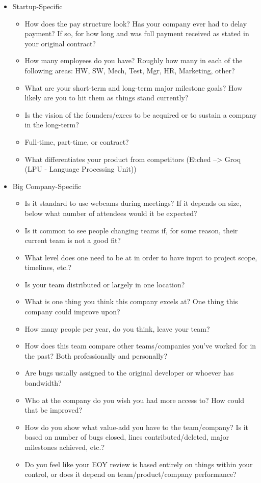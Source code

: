 \documentclass{article}
\begin{document}
\begin{itemize}
\begin{itemize}
    \end{itemize}
  \item Startup-Specific
    \begin{itemize}
      \item How does the pay structure look? Has your company ever had to delay payment? If so, for how long and was full payment received as stated in your original contract?
      \item How many employees do you have? Roughly how many in each of the following areas: HW, SW, Mech, Test, Mgr, HR, Marketing, other?
      \item What are your short-term and long-term major milestone goals? How likely are you to hit them as things stand currently?
      \item Is the vision of the founders/execs to be acquired or to sustain a company in the long-term?
      \item Full-time, part-time, or contract?
      \item What differentiates your product from competitors (Etched --> Groq (LPU - Language Processing Unit))
    \end{itemize}
  \item Big Company-Specific
    \begin{itemize}
      \item Is it standard to use webcams during meetings? If it depends on size, below what number of attendees would it be expected?
      \item Is it common to see people changing teams if, for some reason, their current team is not a good fit?
      \item What level does one need to be at in order to have input to project scope, timelines, etc.?
      \item Is your team distributed or largely in one location?
      \item What is one thing you think this company excels at? One thing this company could improve upon?
      \item How many people per year, do you think, leave your team?
      \item How does this team compare other teams/companies you've worked for in the past? Both professionally and personally?
      \item Are bugs usually assigned to the original developer or whoever has bandwidth?
      \item Who at the company do you wish you had more access to? How could that be improved?
      \item How do you show what value-add you have to the team/company? Is it based on number of bugs closed, lines contributed/deleted, major milestones achieved, etc.?
      \item Do you feel like your EOY review is based entirely on things within your control, or does it depend on team/product/company performance?
    \end{itemize}
\end{itemize}
\end{document}
